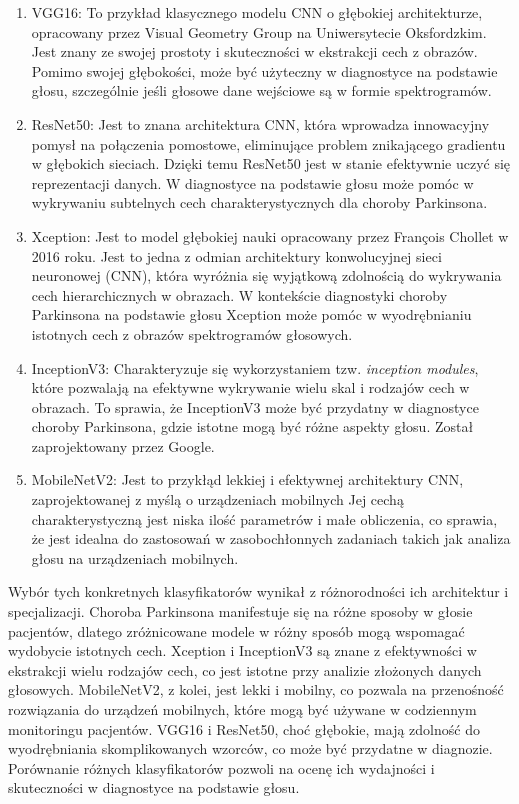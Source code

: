 \begin{enumerate}[label={\alph*)}]
    \item VGG16: To przykład klasycznego modelu CNN o głębokiej architekturze, opracowany przez Visual Geometry Group na Uniwersytecie Oksfordzkim.
    Jest znany ze swojej prostoty i skuteczności w ekstrakcji cech z obrazów.
    Pomimo swojej głębokości, może być użyteczny w diagnostyce na podstawie głosu, szczególnie jeśli głosowe dane wejściowe są w formie spektrogramów.

    \item ResNet50: Jest to znana architektura CNN, która wprowadza innowacyjny pomysł na połączenia pomostowe, eliminujące problem znikającego gradientu w głębokich sieciach.
    Dzięki temu ResNet50 jest w stanie efektywnie uczyć się reprezentacji danych.
    W diagnostyce na podstawie głosu może pomóc w wykrywaniu subtelnych cech charakterystycznych dla choroby Parkinsona.

    \item Xception: Jest to model głębokiej nauki opracowany przez François Chollet w 2016 roku.
    Jest to jedna z odmian architektury konwolucyjnej sieci neuronowej (CNN), która wyróżnia się wyjątkową zdolnością do wykrywania cech hierarchicznych w obrazach.
    W kontekście diagnostyki choroby Parkinsona na podstawie głosu Xception może pomóc w wyodrębnianiu istotnych cech z obrazów spektrogramów głosowych.

    \item InceptionV3: Charakteryzuje się wykorzystaniem tzw. \emph{inception modules}, które pozwalają na efektywne wykrywanie wielu skal i rodzajów cech w obrazach.
    To sprawia, że InceptionV3 może być przydatny w diagnostyce choroby Parkinsona, gdzie istotne mogą być różne aspekty głosu.
    Został zaprojektowany przez Google.

    \item MobileNetV2: Jest to przykłąd lekkiej i efektywnej architektury CNN, zaprojektowanej z myślą o urządzeniach mobilnych
    Jej cechą charakterystyczną jest niska ilość parametrów i małe obliczenia, co sprawia, że jest idealna do zastosowań w zasobochłonnych zadaniach takich jak analiza głosu na urządzeniach mobilnych.

\end{enumerate}

Wybór tych konkretnych klasyfikatorów wynikał z różnorodności ich architektur i specjalizacji.
Choroba Parkinsona manifestuje się na różne sposoby w głosie pacjentów, dlatego zróżnicowane modele w różny sposób mogą wspomagać wydobycie istotnych cech.
Xception i InceptionV3 są znane z efektywności w ekstrakcji wielu rodzajów cech, co jest istotne przy analizie złożonych danych głosowych.
MobileNetV2, z kolei, jest lekki i mobilny, co pozwala na przenośność rozwiązania do urządzeń mobilnych, które mogą być używane w codziennym monitoringu pacjentów.
VGG16 i ResNet50, choć głębokie, mają zdolność do wyodrębniania skomplikowanych wzorców, co może być przydatne w diagnozie.
Porównanie różnych klasyfikatorów pozwoli na ocenę ich wydajności i skuteczności w diagnostyce na podstawie głosu.

